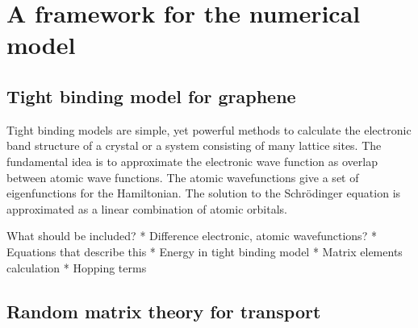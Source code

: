 \chapter{A framework for the numerical model}

\section{Tight binding model for graphene}

Tight binding models are simple, yet powerful methods to calculate the electronic band structure of a crystal or a system consisting of many lattice sites. The fundamental idea is to approximate the electronic wave function as overlap between atomic wave functions. The atomic wavefunctions give a set of eigenfunctions for the Hamiltonian.
The solution to the Schrödinger equation is approximated as a linear combination of atomic orbitals.

What should be included?
* Difference electronic, atomic wavefunctions?
* Equations that describe this
* Energy in tight binding model
* Matrix elements calculation
* Hopping terms



\section{Random matrix theory for transport}